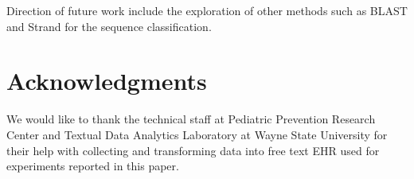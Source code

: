 \documentclass{amia}
\begin{document}
Direction of future work include the exploration of other methods such as BLAST \cite{altschul1990basic} and Strand \cite{drew2014strand} for the sequence classification. 


\section*{Acknowledgments}
We would like to thank the technical staff at Pediatric Prevention Research Center and Textual Data Analytics Laboratory at Wayne State University for their help with collecting and transforming data into free text EHR used for experiments reported in this paper. 



\end{document}
